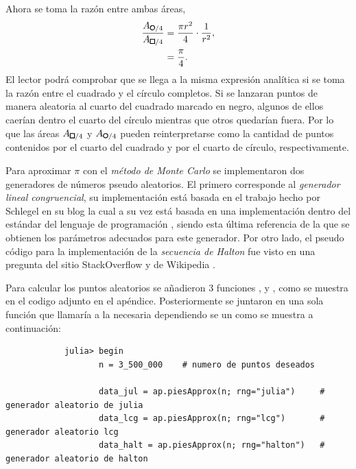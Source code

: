 \begin{enumerate}
\begin{solution}
        Ahora se toma la razón entre ambas áreas,
        \begin{align*}
            \frac{A_{\circlefig/4}}{A_{\squarefig/4}} & = \frac{\pi r^2}{4} \cdot \frac{1}{r^2} , \\
            & = \frac{\pi}{4} .
        \end{align*}
        El lector podrá comprobar que se llega a la misma expresión analítica si se toma la razón entre el cuadrado y el círculo completos. Si se lanzaran puntos de manera aleatoria al cuarto del cuadrado marcado en negro, algunos de ellos caerían dentro el cuarto del círculo mientras que otros quedarían fuera. Por lo que las áreas $A_{\squarefig/4}$ y $A_{\circlefig/4}$ pueden reinterpretarse como la cantidad de puntos contenidos por el cuarto del cuadrado y por el cuarto de círculo, respectivamente.

        Para aproximar $\pi$ con el \textit{método de Monte Carlo} se implementaron dos generadores de números pseudo aleatorios. El primero corresponde al \textit{generador lineal congruencial}, su implementación está basada en el trabajo hecho por Schlegel en su blog \cite{schlegel2008lcg} la cual a su vez está basada en una implementación dentro del estándar del lenguaje de programación  \cite{saucier2000computer}, siendo esta última referencia de la que se obtienen los parámetros adecuados para este generador. Por otro lado, el pseudo código para la implementación de la \textit{secuencia de Halton} fue visto en una pregunta del sitio StackOverflow \cite{stack2013halton} y de Wikipedia \cite{wiki2013halton}.

        Para calcular los puntos aleatorios se añadieron 3 funciones ,  y , como se muestra en el codigo adjunto en el apéndice. Posteriormente se juntaron en una sola función que llamaría a la necesaria dependiendo se un  como se muestra a continuación:
        \begin{verbatim}
            julia> begin
                   n = 3_500_000    # numero de puntos deseados
                   
                   data_jul = ap.piesApprox(n; rng="julia")     # generador aleatorio de julia
                   data_lcg = ap.piesApprox(n; rng="lcg")       # generador aleatorio lcg
                   data_halt = ap.piesApprox(n; rng="halton")   # generador aleatorio de halton
                   

\end{verbatim}
\end{solution}
\end{enumerate}

